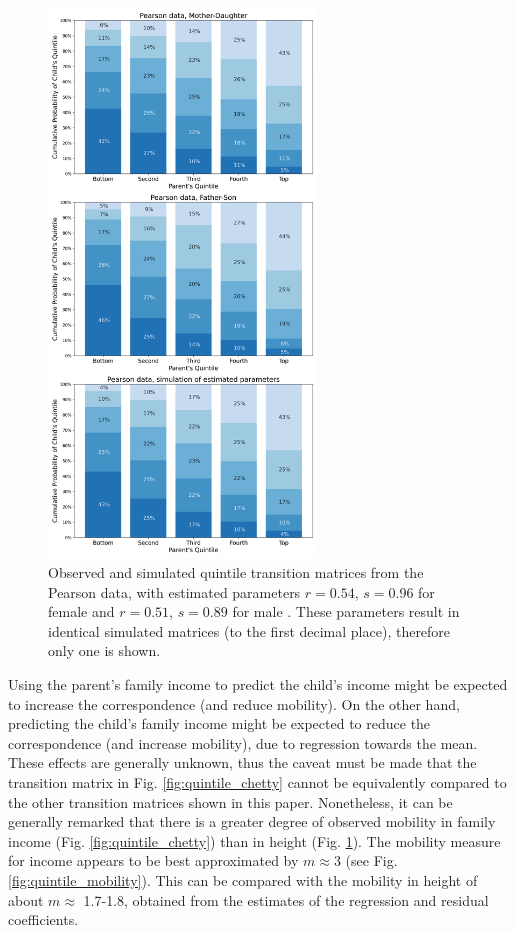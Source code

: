 \documentclass{svproc} %
\begin{document}
\begin{figure}[H]
\centering
\includegraphics[width=2.8in]{figures/quintile-pearson.png} 
\caption{Observed and simulated quintile transition matrices from the Pearson data, with estimated parameters $r = 0.54$, $s = 0.96$ for female and $r = 0.51$, $s = 0.89$ for male \cite{pearson}. These parameters result in identical simulated matrices (to the first decimal place), therefore only one is shown.}
\label{fig:quintile_pearson}
\end{figure}

Using the parent's family income to predict the child's income might be expected to increase the correspondence (and reduce mobility). On the other hand, predicting the child's family income might be expected to reduce the correspondence (and increase mobility), due to regression towards the mean. These effects are generally unknown, thus the caveat must be made that the transition matrix in Fig. \ref{fig:quintile_chetty} cannot be equivalently compared to the other transition matrices shown in this paper. Nonetheless, it can be generally remarked that there is a greater degree of observed mobility in family income (Fig. \ref{fig:quintile_chetty}) than in height (Fig. \ref{fig:quintile_pearson}). The mobility measure for income appears to be best approximated by $m \approx 3$ (see Fig. \ref{fig:quintile_mobility}). This can be compared with the mobility in height of about $m \approx$ 1.7-1.8, obtained from the estimates of the regression and residual coefficients.
\end{document}
